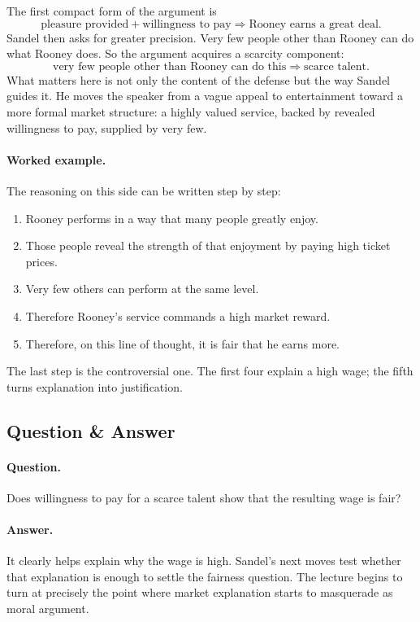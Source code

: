 The first compact form of the argument is
\begin{equation}
\text{pleasure provided} + \text{willingness to pay}
\Longrightarrow
\text{Rooney earns a great deal}.
\end{equation}
Sandel then asks for greater precision. Very few people other than Rooney can do what Rooney does. So the argument acquires a scarcity component:
\begin{equation}
\text{very few people other than Rooney can do this}
\Longrightarrow
\text{scarce talent}.
\end{equation}
What matters here is not only the content of the defense but the way Sandel guides it. He moves the speaker from a vague appeal to entertainment toward a more formal market structure: a highly valued service, backed by revealed willingness to pay, supplied by very few.

\paragraph{Worked example.} The reasoning on this side can be written step by step:
\begin{enumerate}
\item Rooney performs in a way that many people greatly enjoy.
\item Those people reveal the strength of that enjoyment by paying high ticket prices.
\item Very few others can perform at the same level.
\item Therefore Rooney's service commands a high market reward.
\item Therefore, on this line of thought, it is fair that he earns more.
\end{enumerate}
The last step is the controversial one. The first four explain a high wage; the fifth turns explanation into justification.

\subsection{Question \& Answer}

\paragraph{Question.} Does willingness to pay for a scarce talent show that the resulting wage is fair?

\paragraph{Answer.} It clearly helps explain why the wage is high. Sandel's next moves test whether that explanation is enough to settle the fairness question. The lecture begins to turn at precisely the point where market explanation starts to masquerade as moral argument.

